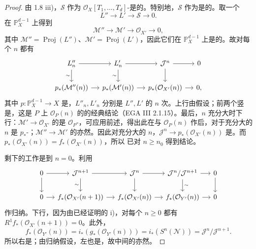 \begin{proof}
由 1.8 iii)，$\mathcal S$ 作为 $\mathcal O_X[T_1,\ldots,T_d]$-是的。特别地，$\mathcal S$ 作为是的。取一个
\[
L''\longrightarrow L'\longrightarrow\mathcal S\longrightarrow0.
\]
在 $\mathbb P_X^{d-1}$ 上得到
\[
\mathcal M''\longrightarrow\mathcal M'\longrightarrow\mathcal O_{X'}\longrightarrow0,
\]
其中 $\mathcal M''=\operatorname{Proj}(L'')$、$\mathcal M'=\operatorname{Proj}(L')$，因此它们在 $\mathbb P_X^{d-1}$ 上是的。故对每个 $n$ 都有
\[
\begin{tikzcd}[column sep=small]
L''_n\arrow[r]\arrow[d,"\sim"']&L'_n\arrow[r]\arrow[d,"\sim"']&\mathcal J^n\arrow[r]\arrow[d]&0\\
p_*(\mathcal M''(n))\arrow[r]&p_*(\mathcal M'(n))\arrow[r]&p_*(\mathcal O_{X'}(n))\arrow[r]&0,
\end{tikzcd}
\]
其中 $p:\mathbb P_X^{d-1}\to X$ 是，$L''_n,L'_n$ 分别是 $L'',L'$ 的 $n$ 次。上行由假设；前两个竖是，这是 $P$ 上 $\mathcal O_P(n)$ 的的经典结论（EGA III 2.1.15）。最后，$n$ 充分大时下行：$\mathcal M'\to\mathcal O_{X'}$ 的是 $\mathcal O_P$-，可应用前述，得出此在与 $\mathcal O_P(n)$ 作后，对于充分大的 $n$ 是 $p_*$-；$\mathcal M''\to\mathcal M'$ 的亦然。因此对充分大的 $n$，$\mathcal J^n\to p_*(\mathcal O_{X'}(n))$ 是。而 $p_*(\mathcal O_{X'}(n))=f_*(\mathcal O_{X'}(n))$，所以
已对 $n\geq n_0$ 得到结论。

剩下的工作是到 $n=0$。利用
\[
\begin{tikzcd}[column sep=small]
0\arrow[r]\arrow[d]&\mathcal J^{n+1}\arrow[r]\arrow[d,"\sim"']&\mathcal J^n\arrow[r]\arrow[d]&\mathcal J^n/\mathcal J^{n+1}\arrow[r]\arrow[d,"\sim"]&0\arrow[d]\\
0\arrow[r]&f_*(\mathcal O_{X'}(n+1))\arrow[r]&f_*(\mathcal O_{X'}(n))\arrow[r]&f_*(\mathcal O_{Y'}(n))\arrow[r]&0
\end{tikzcd}
\]
作归纳。下行，因为由已经证明的 i)，对每个 $n\geq0$ 都有 $R^1f_*(\mathcal O_{X'}(n+1))=0$。此外，
\[
f_*(\mathcal O_{Y'}(n))=i_*(g_*(\mathcal O_{Y'}(n)))=i_*(S^n(\mathcal N))=\mathcal J^n/\mathcal J^{n+1}.
\]
所以右是；由归纳假设，左也是，故中间的亦然。
\end{proof}

